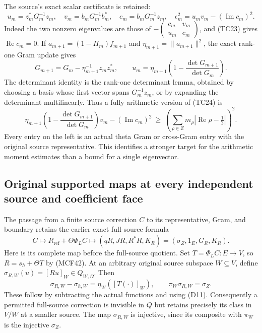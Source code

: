 The source's exact scalar certificate is retained:
\[
 u_m=z_m^*G_m^{-1}z_m,\quad
 v_m=b_mG_m^{-1}b_m^*,\quad c_m=b_mG_m^{-1}z_m,\quad
 \epsilon_m^2=u_mv_m-(\operatorname{Im}c_m)^2.
 \tag{TC26}
\]
Indeed the two nonzero eigenvalues are those of
\(-\left(\begin{smallmatrix}c_m&v_m\\u_m&\overline{c_m}\end{smallmatrix}\right)\),
and (TC23) gives \(\operatorname{Re}c_m=0\).
If \(a_{m+1}=(1-\Pi_m)f_{m+1}\) and
\(\eta_{m+1}=\|a_{m+1}\|^2\), the exact rank-one Gram update gives
\[
 G_{m+1}=G_m-\eta_{m+1}^{-1}z_mz_m^*,\qquad
 u_m=\eta_{m+1}
       \left(1-\frac{\det G_{m+1}}{\det G_m}\right).
 \tag{TC27}
\]
The determinant identity is the rank-one determinant lemma, obtained
by choosing a basis whose first vector spans \(G_m^{-1}z_m\), or
by expanding the determinant multilinearly.  Thus a fully arithmetic
version of (TC24) is
\[
 \eta_{m+1}\left(1-\frac{\det G_{m+1}}{\det G_m}\right)v_m
       -(\operatorname{Im}c_m)^2
 \ \geq\
 \left(\sum_{\rho\in Z}m_\rho
           |\operatorname{Re}\rho-\tfrac12|\right)^2 .
 \tag{TC28}
\]
Every entry on the left is an actual theta Gram or cross-Gram entry
with the original source representative.  This identifies a stronger
target for the arithmetic moment estimates than a bound for a single
eigenvector.


\subsection{Original supported maps at every independent source and coefficient face}

The passage from a finite source correction $C$ to its representative,
Gram, and boundary retains the earlier exact full-source formula
\[
C\longmapsto R_{\mathrm{ref}}+\Theta\Phi_LC
\longmapsto(qR,JR,R^*R,K_R)
=(\sigma_Z,1_E,G_R,K_R).
\tag{TC29}
\]
Here is its complete map before the full-source quotient.  Set
$T=\Phi_LC:E\to V$, so $R=s_h+\Theta T$ by (MCF42).  At an
arbitrary original source subspace $W\subseteq V$, define
$\sigma_{R,W}(u)=[Ru]_W\in Q_{W,\Omega}$.  Then
\[
\sigma_{R,W}-\sigma_{h,W}=\eta_W([T(\cdot)]_W),
\qquad \pi_W\sigma_{R,W}=\sigma_Z.
\tag{TC29a}
\]
These follow by subtracting the actual functions and using (D11).
Consequently a permitted full-source correction is invisible in
$Q$ but retains precisely its class in $V/W$ at a smaller source.
The map $\sigma_{R,W}$ is injective, since its composite with
$\pi_W$ is the injective $\sigma_Z$.

